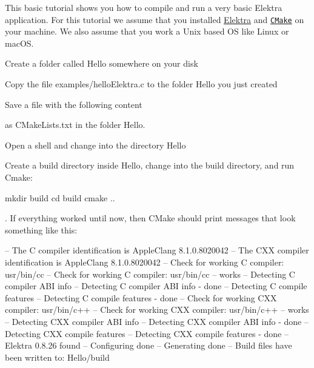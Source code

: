 This basic tutorial shows you how to compile and run a very basic Elektra application. For this tutorial we assume that you installed \hyperlink{doc_INSTALL_md}{Elektra} and \href{http://cmake.org}{\tt C\+Make} on your machine. We also assume that you work a Unix based OS like Linux or mac\+OS.


\begin{DoxyEnumerate}
\item Create a folder called {\ttfamily Hello} somewhere on your disk
\item Copy the file {\ttfamily examples/hello\+Elektra.\+c} to the folder {\ttfamily Hello} you just created
\item Save a file with the following content
\end{DoxyEnumerate}




as {\ttfamily C\+Make\+Lists.\+txt} in the folder {\ttfamily Hello}.


\begin{DoxyEnumerate}
\item Open a shell and change into the directory {\ttfamily Hello}
\item Create a build directory inside {\ttfamily Hello}, change into the build directory, and run Cmake\+:
\end{DoxyEnumerate}


\begin{DoxyCode}
mkdir build
cd build
cmake ..
\end{DoxyCode}


. If everything worked until now, then C\+Make should print messages that look something like this\+:


\begin{DoxyCode}
-- The C compiler identification is AppleClang 8.1.0.8020042
-- The CXX compiler identification is AppleClang 8.1.0.8020042
-- Check for working C compiler: usr/bin/cc
-- Check for working C compiler: usr/bin/cc -- works
-- Detecting C compiler ABI info
-- Detecting C compiler ABI info - done
-- Detecting C compile features
-- Detecting C compile features - done
-- Check for working CXX compiler: usr/bin/c++
-- Check for working CXX compiler: usr/bin/c++ -- works
-- Detecting CXX compiler ABI info
-- Detecting CXX compiler ABI info - done
-- Detecting CXX compile features
-- Detecting CXX compile features - done
-- Elektra 0.8.26 found
-- Configuring done
-- Generating done
-- Build files have been written to: Hello/build
\end{DoxyCode}



